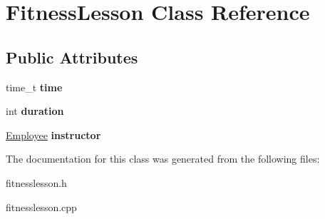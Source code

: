 \hypertarget{class_fitness_lesson}{\section{Fitness\-Lesson Class Reference}
\label{class_fitness_lesson}
}
\subsection*{Public Attributes}
\begin{DoxyCompactItemize}
\item 
\hypertarget{class_fitness_lesson_ad70e19a363a1cec4bfbf84ddb0269c98}{time\-\_\-t {\bfseries time}}\label{class_fitness_lesson_ad70e19a363a1cec4bfbf84ddb0269c98}

\item 
\hypertarget{class_fitness_lesson_a5dd91cc4512335304ff67e5fff54099e}{int {\bfseries duration}}\label{class_fitness_lesson_a5dd91cc4512335304ff67e5fff54099e}

\item 
\hypertarget{class_fitness_lesson_a25c4e6328a305fda4f39f19edf70238c}{\hyperlink{class_employee}{Employee} {\bfseries instructor}}\label{class_fitness_lesson_a25c4e6328a305fda4f39f19edf70238c}

\end{DoxyCompactItemize}


The documentation for this class was generated from the following files\-:\begin{DoxyCompactItemize}
\item 
fitnesslesson.\-h\item 
fitnesslesson.\-cpp\end{DoxyCompactItemize}
